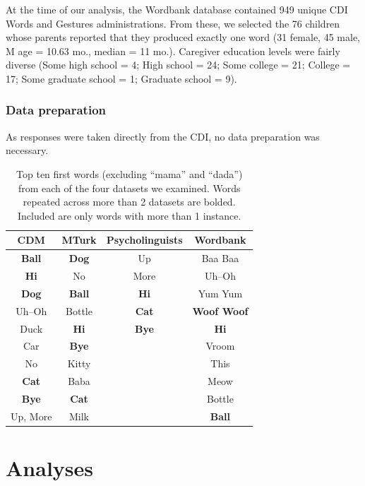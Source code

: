 \documentclass[10pt,letterpaper]{article}
\begin{document}
At the time of our analysis, the Wordbank database contained 949 unique CDI Words and Gestures administrations. From these, we selected the 76 children whose parents reported that they produced exactly one word (31 female, 45 male, M age = 10.63 mo., median = 11 mo.). Caregiver education levels were fairly diverse (Some high school = 4; High school = 24; Some college = 21; College = 17; Some graduate school = 1; Graduate school = 9). 

\subsubsection{Data preparation}

As responses were taken directly from the CDI, no data preparation was necessary.


\begin{table}[tb]
\centering
\begin{tabular}{cccc}
\hline
{\bf CDM} & {\bf MTurk} & {\bf Psycholinguists} & {\bf Wordbank} \\ 
\hline
\textbf{Ball} & \textbf{Dog} & Up & Baa Baa \\ 
\textbf{Hi} & No & More & Uh--Oh \\
\textbf{Dog} & \textbf{Ball} & \textbf{Hi} & Yum Yum \\ 
Uh--Oh & Bottle & \textbf{Cat} & \textbf{Woof Woof} \\ 
Duck & \textbf{Hi} & \textbf{Bye} & \textbf{Hi} \\
Car & \textbf{Bye} &  & Vroom \\
No & Kitty &  & This \\
\textbf{Cat} & Baba &  & Meow \\
\textbf{Bye} & \textbf{Cat} &  & Bottle \\
Up, More & Milk &  & \textbf{Ball} \\
\hline 
\end{tabular}
\caption{\label{tab:top10} Top ten first words (excluding ``mama'' and ``dada'') from each of the four datasets we examined. Words repeated across more than 2 datasets are bolded. Included are only words with more than 1 instance.}
\vspace{-3em}
\end{table}

\section{Analyses}
\end{document}
